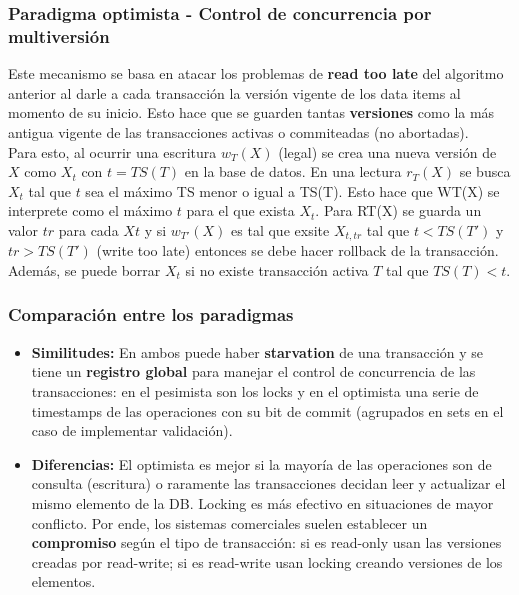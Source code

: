 \subsubsection*{Paradigma optimista - Control de concurrencia por multiversión}
Este mecanismo se basa en atacar los problemas de \textbf{read too late} del algoritmo anterior al darle a cada transacción la versión vigente de los data items al momento de su inicio. Esto hace que se guarden tantas \textbf{versiones} como la más antigua vigente de las transacciones activas o commiteadas (no abortadas). \\
Para esto, al ocurrir una escritura $w_T(X)$ (legal) se crea una nueva versión de $X$ como $X_t$ con $t = TS(T)$ en la base de datos. En una lectura $r_T(X)$ se busca $X_t$ tal que $t$ sea el máximo TS menor o igual a TS(T). Esto hace que WT(X) se interprete como el máximo $t$ para el que exista $X_t$. Para RT(X) se guarda un valor $tr$ para cada $Xt$ y si $w_{T'}(X)$ es tal que exsite $X_{t,tr}$ tal que $t < TS(T')$ y $tr > TS(T')$ (write too late) entonces se debe hacer rollback de la transacción. Además, se puede borrar $X_t$ si no existe transacción activa $T$ tal que $TS(T) < t$.

\subsubsection*{Comparación entre los paradigmas}
\begin{itemize}
    \item \textbf{Similitudes:} En ambos puede haber \textbf{starvation} de una transacción y se tiene un \textbf{registro global} para manejar el control de concurrencia de las transacciones: en el pesimista son los locks y en el optimista una serie de timestamps de las operaciones con su bit de commit (agrupados en sets en el caso de implementar validación).
    \item \textbf{Diferencias:} El optimista es mejor si la mayoría de las operaciones son de consulta (escritura) o raramente las transacciones decidan leer y actualizar el mismo elemento de la DB. Locking es más efectivo en situaciones de mayor conflicto. Por ende, los sistemas comerciales suelen establecer un \textbf{compromiso} según el tipo de transacción: si es read-only usan las versiones creadas por read-write; si es read-write usan locking creando versiones de los elementos.
\end{itemize}
